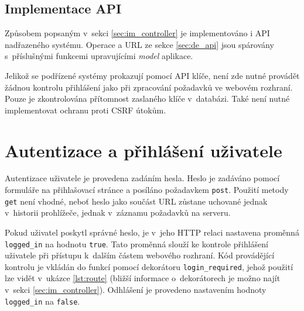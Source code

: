 \subsection{Implementace API}


Způsobem popsaným v~sekci \ref{sec:im_controller} je implementováno i API nadřazeného systému. Operace a URL ze sekce \ref{sec:de_api} jsou spárovány s~příslušnými funkcemi upravujícími \textit{model} aplikace.

Jelikož se podřízené systémy prokazují pomocí API klíče, není zde nutné provádět žádnou kontrolu přihlášení jako při zpracování požadavků ve webovém rozhraní. Pouze je zkontrolována přítomnost zaslaného klíče v~databázi. Také není nutné implementovat ochranu proti CSRF útokům.

\section{Autentizace a přihlášení uživatele}
\label{sec:im_auth}

Autentizace uživatele je provedena zadáním hesla. Heslo je zadáváno pomocí formuláře na přihlašovací stránce a posíláno požadavkem \texttt{post}. Použití metody \texttt{get} není vhodné, neboť heslo jako součást URL zůstane uchované jednak v~historii prohlížeče, jednak v~záznamu požadavků na serveru.

Pokud uživatel poskytl správné heslo, je v~jeho HTTP relaci nastavena proměnná \texttt{logged\_in} na hodnotu \texttt{true}. Tato proměnná slouží ke kontrole přihlášení uživatele při přístupu k~dalším částem webového rozhraní. Kód provádějící kontrolu je vkládán do funkcí pomocí dekorátoru \texttt{login\_required}, jehož použití lze vidět v~ukázce \ref{lst:route} (bližší informace o~dekorátorech je možno najít v~sekci \ref{sec:im_controller}). Odhlášení je provedeno nastavením hodnoty \texttt{logged\_in} na \texttt{false}.



